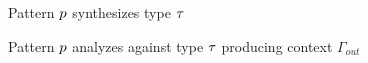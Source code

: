 \begin{figure}[htbp]
  \raggedright
  \judgbox{\ensuremath{\ctxSynPat{\Gamma}{\PMV}{\TMV}}} Pattern $\PMV$ synthesizes type $\TMV$
  \begin{mathpar}
   
   

  \end{mathpar}
  \label{fig:calculus-pattern-synthesis}
\end{figure}


\begin{figure}[htbp]
  \raggedright
   Pattern $\PMV$ analyzes against type $\TMV$ producing context $\Gamma_{out}$
  \begin{mathpar}
   
   

  \end{mathpar}
  \label{fig:calculus-pattern-analysis}
\end{figure}


